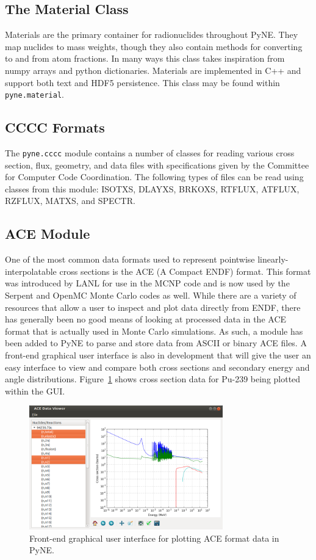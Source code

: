 \documentclass{anstrans}
\begin{document}
\subsection{The Material Class} 
Materials are the primary container for radionuclides throughout PyNE. They map 
nuclides to mass weights, though they also contain methods for converting to and from 
atom fractions.  In many ways this class takes inspiration from numpy arrays 
and python dictionaries.  Materials are implemented in C++ and support both text
and HDF5 persistence.  This class may be found within \texttt{pyne.material}.


\subsection{CCCC Formats}
The \texttt{pyne.cccc} module contains a number of classes for reading various cross section, 
flux, geometry, and data files with specifications given by the Committee for 
Computer Code Coordination. The following types of files can be read using 
classes from this module: ISOTXS, DLAYXS, BRKOXS, RTFLUX, ATFLUX, RZFLUX, MATXS, 
and SPECTR.

\subsection{ACE Module}

One of the most common data formats used to represent pointwise
linearly-interpolatable cross sections is the ACE (A Compact ENDF) format. This
format was introduced by LANL for use in the MCNP \cite{mcnp} code and is now
used by the Serpent \cite{serpent} and OpenMC \cite{openmc} Monte Carlo codes as
well. While there are a variety of resources that allow a user to inspect and
plot data directly from ENDF, there has generally been no good means of looking
at processed data in the ACE format that is actually used in Monte Carlo
simulations. As such, a module has been added to PyNE to parse and store data
from ASCII or binary ACE files. A front-end graphical user interface is also in
development that will give the user an easy interface to view and compare both
cross sections and secondary energy and angle
distributions. Figure~\ref{fig:ace-gui} shows cross section data for Pu-239
being plotted within the GUI.
\begin{figure}[ht]
  \centering
  \includegraphics[width=3.3in]{ace-gui.png}
  \caption{Front-end graphical user interface for plotting ACE format data in
    PyNE.}
  \label{fig:ace-gui}
\end{figure}
\end{document}
